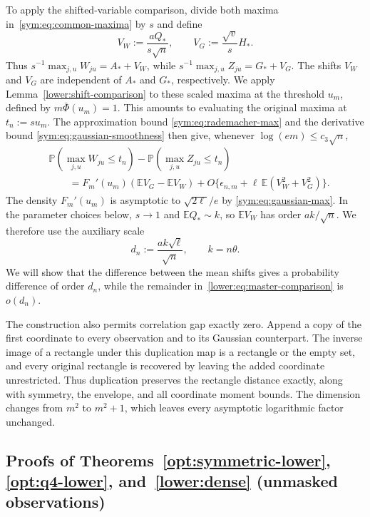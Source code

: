 \documentclass[11pt,letterpaper]{article}
\newenvironment{recovered}{}{}
\theoremstyle{remark}
\newcommand{\E}{\mathbb E}
\newcommand{\Pp}{\mathbb P}
\begin{document}
To apply the shifted-variable comparison, divide both maxima
in~\eqref{sym:eq:common-maxima} by \(s\) and define
\[
 V_W:=\frac{aQ_*}{s\sqrt n},\qquad
 V_G:=\frac{\sqrt v}{s}H_*.
\]
Thus \(s^{-1}\max_{j,u}W_{ju}=A_*+V_W\), while
\(s^{-1}\max_{j,u}Z_{ju}=G_*+V_G\).
\begin{recovered}
The shifts \(V_W\) and \(V_G\) are independent of \(A_*\) and
\(G_*\), respectively. We apply Lemma~\ref{lower:shift-comparison}
to these scaled maxima at the threshold \(u_m\), defined by
\(m\bar\Phi(u_m)=1\). This amounts to evaluating the original maxima
at \(t_n:=su_m\). The approximation bound
\eqref{sym:eq:rademacher-max} and the derivative bound
\eqref{sym:eq:gaussian-smoothness} then give, whenever
\(\log(em)\le{c_3}\sqrt n\),
\end{recovered}
\begin{equation}
\begin{split}
 &\Pp(\max_{j,u}W_{ju}\le t_n)-\Pp(\max_{j,u}Z_{ju}\le t_n)\\
 &\qquad=F_m'(u_m)(\E V_G-\E V_W)
       +O\{\epsilon_{n,m}+\ell\,\E(V_W^2+V_G^2)\}.
\end{split}
 \label{lower:eq:master-comparison}
\end{equation}
The density \(F_m'(u_m)\) is asymptotic to \(\sqrt{2\ell}/e\) {by \eqref{sym:eq:gaussian-max}}.
In the parameter choices below, \(s\to1\) and \(\E Q_*\sim k\),
so \(\E V_W\) has order \(ak/\sqrt n\).
We therefore use the auxiliary scale
\begin{equation}
 d_n:=\frac{ak\sqrt\ell}{\sqrt n},\qquad k=n\theta.
 \label{lower:eq:proof-scale}
\end{equation}
We will show that the difference between the mean shifts gives a
probability difference of order \(d_n\), while the remainder
in~\eqref{lower:eq:master-comparison} is \(o(d_n)\).


The construction also permits correlation gap
exactly zero. Append a copy of the first coordinate to every
observation and to its Gaussian counterpart. The inverse image of
a rectangle under this duplication map is a rectangle or the empty
set, and every original rectangle is recovered by leaving the added
coordinate unrestricted. Thus duplication preserves the rectangle
distance exactly, along with symmetry, the envelope, and all
coordinate moment bounds. The dimension changes from \(m^2\) to
\(m^2+1\), which leaves every asymptotic logarithmic factor unchanged.

\subsection{Proofs of Theorems~\ref*{opt:symmetric-lower}, \ref*{opt:q4-lower}, and~\ref*{lower:dense} (unmasked observations)}
\label{app:symmetric-lower}
\end{document}
